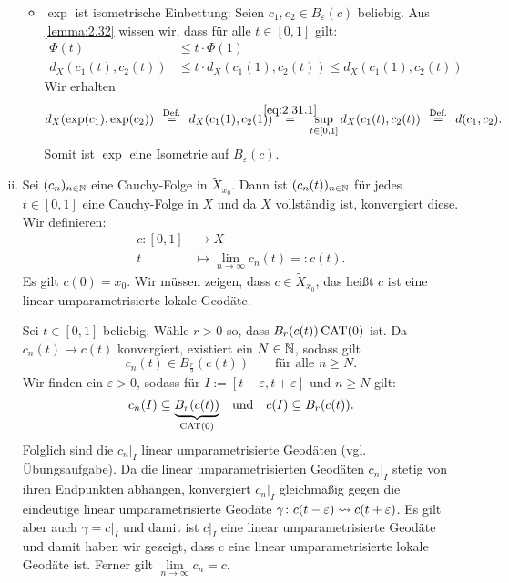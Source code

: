 \begin{beweis}
\begin{enumerate}[(i)]
\begin{itemize}
			
			\item $\exp$ ist isometrische Einbettung:
			Seien $c_1,c_2 \in B_\varepsilon(c)$ beliebig.
			Aus \autoref{lemma:2.32} wissen wir, dass für alle $t \in [0,1]$ gilt:
			\begin{align}
				\Phi(t) &\leq t \cdot \Phi(1) \\
				d_X(c_1(t),c_2(t)) &\leq t \cdot d_X(c_1(1),c_2(t)) \leq d_X(c_1(1),c_2(t)) \label{eq:2.31.1}
			\end{align}
			Wir erhalten
			\[
				d_X(\exp(c_1),\exp(c_2)) \stack{\text{Def.}}{=} d_X(c_1(1),c_2(1))  \stack{\eqref{eq:2.31.1}}{=} \sup_{t \in [0,1]} d_X(c_1(t),c_2(t)) \stack{\text{Def.}}{=} d(c_1,c_2).
			\]
			Somit ist $\exp$ eine Isometrie auf $B_\varepsilon(c)$.
		\end{itemize}
		\item Sei $(c_n)_{n \in \mathbb{N}}$ eine Cauchy-Folge in $\tilde{X}_{x_0}$.
		Dann ist $(c_n(t))_{n \in \mathbb{N}}$ für jedes $t \in [0,1]$ eine Cauchy-Folge in $X$ und da $X$ vollständig ist, konvergiert diese.
		Wir definieren:
		\begin{align*}
			c \colon [0,1] &\longrightarrow X \\
			t &\longmapsto \lim\limits_{n \rightarrow \infty} c_n(t) =: c(t).
		\end{align*}
		Es gilt $c(0) = x_0$.
		Wir müssen zeigen, dass $c \in \tilde{X}_{x_0}$, das heißt $c$ ist eine linear umparametrisierte lokale Geodäte.
		
		Sei $t \in [0,1]$ beliebig.
		Wähle  $r > 0$ so, dass $B_r(c(t)) \operatorname{CAT(0)}$ ist.
		Da $c_n(t) \rightarrow c(t)$ konvergiert, existiert ein $N \in \mathbb{N}$, sodass gilt
		\[
			c_n(t) \in B_{\frac{r}{2}}(c(t)) \qquad \text{für alle } n \geq N.
		\]
		Wir finden ein $\varepsilon > 0$, sodass für $I := [t- \varepsilon, t+ \varepsilon]$ und $n \geq N$ gilt:
		\[
			c_n(I) \subseteq {\underbrace{B_r(c(t))}_{\operatorname{CAT(0)}}} \quad \text{und} \quad c(I) \subseteq B_r(c(t)).
		\]
		Folglich sind die $c_n \big|_I$ linear umparametrisierte Geodäten (vgl. Übungsaufgabe).
		Da die linear umparametrisierten Geodäten $c_n \big|_I$ stetig von ihren Endpunkten abhängen, konvergiert $c_n \big|_I$ gleichmäßig gegen die eindeutige linear umparametrisierte Geodäte $\gamma \colon c(t-\varepsilon) \rightsquigarrow c(t+\varepsilon)$.
		Es gilt aber auch $\gamma = c \big|_I$ und damit ist $c \big|_I$ eine linear umparametrisierte Geodäte und damit haben wir gezeigt, dass $c$ eine linear umparametrisierte lokale Geodäte ist.
		Ferner gilt $\lim\limits_{n \rightarrow \infty} c_n = c$. \qedhere
	\end{enumerate}
\end{beweis}	

